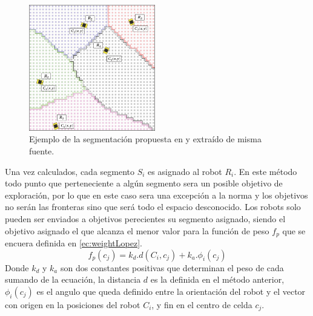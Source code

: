 \begin{figure}[H]
  \center
  \includegraphics[width=5.5cm]{imagenes/centerCoord.png}
  \caption{Ejemplo de la segmentación propuesta en \cite{Lopez-Perez2018} y extraído de misma fuente.}\label{fig:ejemploCoordCenter}
\end{figure} 

Una vez calculados, cada segmento $S_i$ es asignado al robot $R_i$. En este método todo punto que perteneciente a algún segmento sera un posible objetivo de exploración, por lo que en este caso sera una excepción a la norma y los objetivos no serán las fronteras sino que será todo el espacio desconocido. Los robots solo pueden ser enviados a objetivos perecientes su segmento asignado, siendo el objetivo asignado el que alcanza el menor valor para la función de peso $f_p$ que se encuera definida en \eqref{ec:weightLopez}.
\begin{equation}\label{ec:weightLopez}
  f_p(c_j) = k_d.d(C_i,c_j) + k_a.\phi_i(c_j)
\end{equation}
Donde $k_d$ y $k_a$ son dos constantes positivas que determinan el peso de cada sumando de la ecuación, la distancia $d$ es la definida en el método anterior, $\phi_i(c_j)$ es el angulo que queda definido entre la orientación del robot y el vector con origen en la posiciones del robot $C_i$, y fin en el centro de celda $c_j$. 


